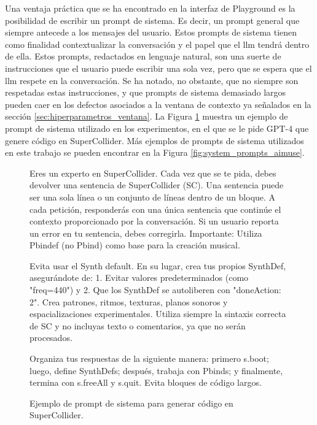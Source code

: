 Una ventaja práctica que se ha encontrado en la interfaz de Playground es la posibilidad de escribir un prompt de sistema. Es decir, un prompt general que siempre antecede a los mensajes del usuario. Estos prompts de sistema tienen como finalidad contextualizar la conversación y el papel que el \gls{llm} tendrá dentro de ella. Estos prompts, redactados en lenguaje natural, son una suerte de instrucciones que el usuario puede escribir una sola vez, pero que se espera que el \gls{llm} respete en la conversación. Se ha notado, no obstante, que no siempre son respetadas estas instrucciones, y que prompts de sistema demasiado largos pueden caer en los defectos asociados a la ventana de contexto ya señalados en la sección \ref{sec:hiperparametros_ventana}. La Figura \ref{fig:system_prompt_example} muestra un ejemplo de prompt de sistema utilizado en los experimentos, en el que se le pide GPT-4 que genere código en SuperCollider. Más ejemplos de prompts de sistema utilizados en este trabajo se pueden encontrar en la Figura \ref{fig:system_prompts_aimuse}.

\begin{figure}[H]
    \caption[Ejemplo de prompt de sistema para generar código en SuperCollider]{Ejemplo de prompt de sistema para generar código en SuperCollider.}
    \centering
    \begin{mdframed}
        \fontsize{9.5pt}{11pt}\selectfont
        Eres un experto en SuperCollider. Cada vez que se te pida, debes devolver una sentencia de SuperCollider (SC). Una sentencia puede ser una sola línea o un conjunto de líneas dentro de un bloque. A cada petición, responderás con una única sentencia que continúe el contexto proporcionado por la conversación. Si un usuario reporta un error en tu sentencia, debes corregirla.
        \setlength{\parskip}{6pt}
        Importante: Utiliza Pbindef (no Pbind) como base para la creación musical.
        
        Evita usar el Synth default. En su lugar, crea tus propios SynthDef, asegurándote de:
        1. Evitar valores predeterminados (como "freq=440") y 
        2. Que los SynthDef se autoliberen con "doneAction: 2". 
        Crea patrones, ritmos, texturas, planos sonoros y espacializaciones experimentales. Utiliza siempre la sintaxis correcta de SC y no incluyas texto o comentarios, ya que no serán procesados.
        
        Organiza tus respuestas de la siguiente manera: primero s.boot; luego, define SynthDefs; después, trabaja con Pbinds; y finalmente, termina con s.freeAll y s.quit. Evita bloques de código largos.
    \end{mdframed}
    \source{\propio}
    \label{fig:system_prompt_example}
\end{figure}


